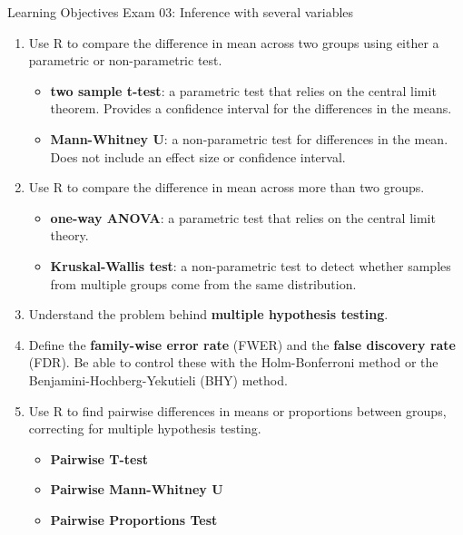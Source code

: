 \documentclass[11pt]{article}
\begin{document}
{\LARGE \textcolor{oiB}{Learning Objectives \hfill Exam 03: Inference with several variables}} \\

\begin{enumerate}
\renewcommand\labelenumi{\textcolor{light}{\textbf{LO \theenumi.}}}
\item Use R to compare the difference in mean across two groups using either
a parametric or non-parametric test.
\begin{itemize}
\renewcommand{\labelitemi}{{\textcolor{dark}{{\tiny $\blacksquare$}}}}
\item \textbf{two sample t-test}: a parametric test that relies on the central
limit theorem. Provides a confidence interval for the differences in the
means.
\item \textbf{Mann-Whitney U}: a non-parametric test for differences in the
mean. Does not include an effect size or confidence interval.
\end{itemize}

\item Use R to compare the difference in mean across more than two groups.
\begin{itemize}
\renewcommand{\labelitemi}{{\textcolor{dark}{{\tiny $\blacksquare$}}}}
\item \textbf{one-way ANOVA}: a parametric test that relies on the central
limit theory.
\item \textbf{Kruskal-Wallis test}: a non-parametric test to detect whether
samples from multiple groups come from the same distribution.
\end{itemize}

\item Understand the problem behind \textbf{multiple hypothesis testing}.

\item Define the \textbf{family-wise error rate} (FWER) and the \textbf{false
discovery rate} (FDR). Be able to control these with the Holm-Bonferroni
method or the Benjamini-Hochberg-Yekutieli (BHY) method.

\item Use R to find pairwise differences in means or proportions between
groups, correcting for multiple hypothesis testing.
\begin{itemize}
\renewcommand{\labelitemi}{{\textcolor{dark}{{\tiny $\blacksquare$}}}}
\item \textbf{Pairwise T-test}
\item \textbf{Pairwise Mann-Whitney U}
\item \textbf{Pairwise Proportions Test}
\end{itemize}


\end{enumerate}
\end{document}

